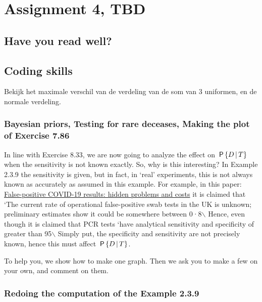 \documentclass[assignments]{subfiles}
\begin{document}
\section{Assignment 4, TBD}


\subsection{Have you read well?}


\subsection{Coding skills}
\label{sec:coding-skills-1}




\begin{exercise}
Bekijk het maximale verschil van de verdeling van de som van 3 uniformen, en de normale verdeling. 
\end{exercise}


\subsubsection{Bayesian priors, Testing for rare deceases, Making the plot of Exercise 7.86}

In line with Exercise 8.33, we are now going to analyze the effect on \(\,\mathsf{P}\left\{D\,\middle|\, T\right\}\) when the sensitivity is not known exactly.
So, why is this interesting?
In Example 2.3.9 the sensitivity is given, but in fact, in `real' experiments, this is not always known as accurately as assumed in this example.
For example, in this paper: \href{https://www.thelancet.com/journals/lanres/article/PIIS2213-2600(20)30453-7/fulltext}{False-positive COVID-19 results: hidden problems and costs} it is claimed that `The current rate of operational false-positive swab tests in the UK is unknown; preliminary estimates show it could be somewhere between 0·8$\backslash$%
Hence, even though it is claimed that PCR tests `have analytical sensitivity and specificity of greater than 95$\backslash$%
Simply put, the specificity and sensitivity are not precisely known, hence this must affect \(\,\mathsf{P}\left\{D\,\middle|\, T\right\}\).

To help you, we show how to make one graph. Then we ask you to make a few on your own, and comment on them.




\label{sec:orgb704f64}

\subsubsection{Redoing the  computation of the  Example 2.3.9}
\label{sec:orge3a48cf}
\end{document}
